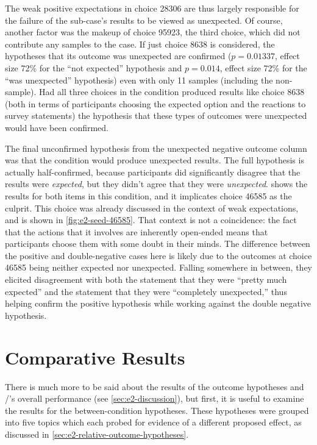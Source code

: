 The weak positive expectations in choice 28306 are thus largely responsible for the failure of the \obvfm{} sub-case's results to be viewed as unexpected.
%
Of course, another factor was the makeup of choice 95923, the third \obvf{} choice, which did not contribute any samples to the \casem{} case.
%
If just choice 8638 is considered, the hypotheses that its outcome was unexpected are confirmed ($p=0.01337$, effect size 72\% for the ``not expected'' hypothesis and $p=0.014$, effect size 72\% for the ``was unexpected'' hypothesis) even with only 11 samples (including the non-\casem{} sample).
%
Had all three choices in the \obv{} condition produced results like choice 8638 (both in terms of participants choosing the expected option and the reactions to survey statements) the hypothesis that these types of outcomes were unexpected would have been confirmed.


The final unconfirmed hypothesis from the unexpected negative outcome column was that the \unxf{} condition would produce unexpected results.
%
The full hypothesis is actually half-confirmed, because participants did significantly disagree that the results were \emph{expected}, but they didn't agree that they were \emph{unexpected}.
%
 shows the results for both items in this condition, and it implicates choice 46585 as the culprit.
%
This choice was already discussed in the context of weak expectations, and is shown in \cref{fig:e2-seed-46585}.
%
That context is not a coincidence: the fact that the actions that it involves are inherently open-ended means that participants choose them with some doubt in their minds.
%
The difference between the positive and double-negative cases here is likely due to the outcomes at choice 46585 being neither expected nor unexpected.
%
Falling somewhere in between, they elicited disagreement with both the statement that they were ``pretty much expected'' and the statement that they were ``completely unexpected,'' thus helping confirm the positive hypothesis while working against the double negative hypothesis.


\section{Comparative Results}

There is much more to be said about the results of the outcome hypotheses and \dunyazad/'s overall performance (see \cref{sec:e2-discussion}), but first, it is useful to examine the results for the between-condition hypotheses.
%
These hypotheses were grouped into five topics which each probed for evidence of a different proposed effect, as discussed in \cref{sec:e2-relative-outcome-hypotheses}.

